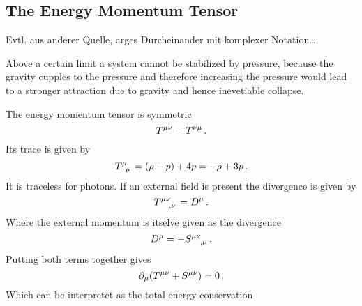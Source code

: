 \subsection{The Energy Momentum Tensor}
Evtl. aus anderer Quelle, arges Durcheinander mit komplexer Notation\ldots
\begin{sidenote}
Above a certain limit a system cannot be stabilized by pressure, because the
gravity cupples to the pressure and therefore increasing the pressure would lead
to a stronger attraction due to gravity and hence inevetiable collapse.
\end{sidenote}
The energy momentum tensor is symmetric 
\begin{equation}
\tensor{T}{^\mu^\nu}=\tensor{T}{^\nu^\mu}\, .
\end{equation}
Its trace is given by
\begin{equation}
\tensor{T}{^\mu_\mu}=(\rho-p)+4p=-\rho+3p\, .
\end{equation}
It is traceless for photons. If an external field is present the divergence is
given by
\begin{equation}
\tensor{T}{^\mu^\nu_,_\nu}=\tensor{D}{^\mu}\,  .
\end{equation}
Where the external momentum is itselve given as the divergence 
\begin{equation}
\tensor{D}{^\mu} =-\tensor{S}{^\mu^\nu_,_\nu}\, . 
\end{equation}
Putting both terms together gives
\begin{equation}
\partial_\mu(\tensor{T}{^\mu^\nu}+\tensor{S}{^\mu^\nu})=0\,,
\end{equation}
Which can be interpretet as the total energy conservation

